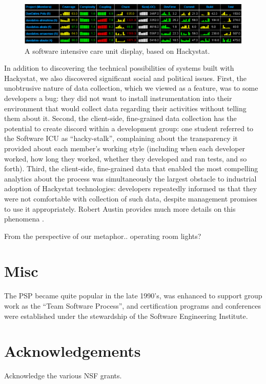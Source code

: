 \documentclass[]{article}
\begin{document}
\begin{figure}[!tb]
\centering
\includegraphics[width=0.90\columnwidth]{portfolio-2008.eps}
\caption{A software intensive care unit display, based on Hackystat.}
\label{fig:icu}
\end{figure}

In addition to discovering the technical possibilities of systems built with Hackystat, we
also discovered significant social and political issues.  First, the unobtrusive
nature of data collection, which we viewed as a feature, was to some developers
a bug: they did not want to install instrumentation into their environment that would
collect data regarding their activities without telling them about it.  Second, the
client-side, fine-grained data collection has the potential to create discord within a
development group: one student referred to the Software ICU as ``hacky-stalk'',
complaining about the transparency it provided about each member's working style
(including when each developer worked, how long they worked, whether they developed and
ran tests, and so forth).  Third, the client-side, fine-grained data that enabled the most
compelling analytics about the process was simultaneously the largest obstacle to
industrial adoption of Hackystat technologies: developers repeatedly informed us that they
were not comfortable with collection of such data, despite management promises to use it
appropriately. Robert Austin provides much more details on this phenomena \cite{Austin96}.

From the perspective of our metaphor.. operating room lights? 


\section{Misc}

The PSP became quite popular in the late 1990's, was enhanced to support group work as the
``Team Software Process'', and certification programs and conferences were established
under the stewardship of the Software Engineering Institute.  



\section{Acknowledgements}

Acknowledge the various NSF grants. 



\end{document}
